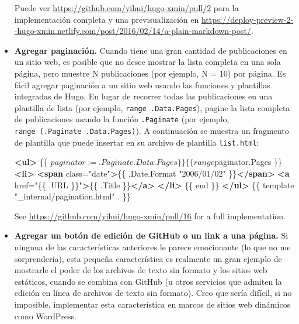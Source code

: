 \documentclass[12pt,]{krantz}
\makeatletter
\newenvironment{Shaded}{\begin{snugshade}}{\end{snugshade}}
\newcommand{\KeywordTok}[1]{\textcolor[rgb]{0.13,0.29,0.53}{\textbf{#1}}}
\newcommand{\NormalTok}[1]{#1}
\newcommand{\OtherTok}[1]{\textcolor[rgb]{0.56,0.35,0.01}{#1}}
\newcommand{\StringTok}[1]{\textcolor[rgb]{0.31,0.60,0.02}{#1}}
\newenvironment{kframe}{%
\medskip{}
\setlength{\fboxsep}{.8em}
 \def\at@end@of@kframe{}%
 \ifinner\ifhmode%
  \def\at@end@of@kframe{\end{minipage}}%
  \begin{minipage}{\columnwidth}%
 \fi\fi%
 \def\FrameCommand##1{\hskip\@totalleftmargin \hskip-\fboxsep
 \colorbox{shadecolor}{##1}\hskip-\fboxsep
     \hskip-\linewidth \hskip-\@totalleftmargin \hskip\columnwidth}%
 \MakeFramed {\advance\hsize-\width
   \@totalleftmargin\z@ \linewidth\hsize
   \@setminipage}}%
 {\par\unskip\endMakeFramed%
 \at@end@of@kframe}
\renewenvironment{Shaded}{\begin{kframe}}{\end{kframe}}
\theoremstyle{definition}
\theoremstyle{definition}
\theoremstyle{definition}
\theoremstyle{remark}
\makeatother
\begin{document}
\begin{itemize}
  Puede ver \url{https://github.com/yihui/hugo-xmin/pull/2} para la
  implementación completa y una previsualización en
  \url{https://deploy-preview-2--hugo-xmin.netlify.com/post/2016/02/14/a-plain-markdown-post/}.
\item
  \textbf{Agregar paginación.} Cuando tiene una gran cantidad de
  publicaciones en un sitio web, es posible que no desee mostrar la
  lista completa en una sola página, pero muestre N publicaciones (por
  ejemplo, N = 10) por página. Es fácil agregar paginación a un sitio
  web usando las funciones y plantillas integradas de Hugo. En lugar de
  recorrer todas las publicaciones en una plantilla de lista (por
  ejemplo, \texttt{range\ .Data.Pages}), pagine la lista completa de
  publicaciones usando la función \texttt{.Paginate} (por ejemplo,
  \texttt{range\ (.Paginate\ .Data.Pages)}). A continuación se muestra
  un fragmento de plantilla que puede insertar en su archivo de
  plantilla \texttt{list.html}:

\begin{Shaded}
\begin{Highlighting}[]
\KeywordTok{<ul>}
\NormalTok{  \{\{ $paginator := .Paginate .Data.Pages \}\}}
\NormalTok{  \{\{ range $paginator.Pages \}\}}
  \KeywordTok{<li>}
    \KeywordTok{<span}\OtherTok{ class=}\StringTok{"date"}\KeywordTok{>}\NormalTok{\{\{ .Date.Format "2006/01/02" \}\}}\KeywordTok{</span>}
    \KeywordTok{<a}\OtherTok{ href=}\StringTok{"\{\{ .URL \}\}"}\KeywordTok{>}\NormalTok{\{\{ .Title \}\}}\KeywordTok{</a>}
  \KeywordTok{</li>}
\NormalTok{  \{\{ end \}\}}
\KeywordTok{</ul>}
\NormalTok{\{\{ template "_internal/pagination.html" . \}\}}
\end{Highlighting}
\end{Shaded}

  See \url{https://github.com/yihui/hugo-xmin/pull/16} for a full
  implementation.
\item
  \textbf{Agregar un botón de edición de GitHub o un link a una página.}
  Si ninguna  de las características
  anteriores le parece emocionante (lo que no me sorprendería), esta
  pequeña característica es realmente un gran ejemplo de mostrarle el
  poder de los archivos de texto sin formato y los sitios web estáticos,
  cuando se combina con GitHub (u otros servicios que admiten la edición
  en línea de archivos de texto sin formato). Creo que sería difícil, si
  no imposible, implementar esta característica en marcos de sitios web
  dinámicos como WordPress.


\end{itemize}
\end{document}
